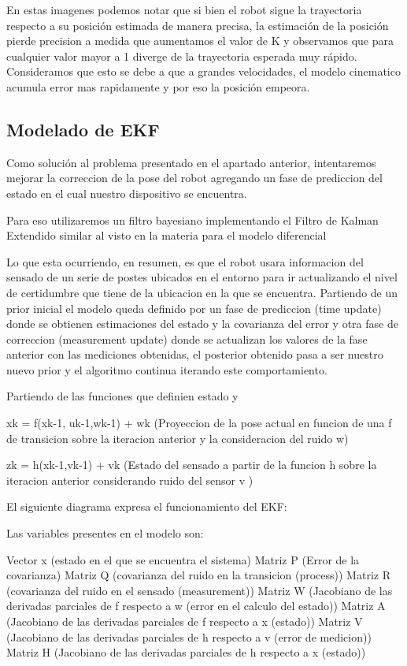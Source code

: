 

En estas imagenes podemos notar que si bien el robot sigue la trayectoria respecto a su posición estimada de manera precisa, la estimación de la posición pierde precision a medida que aumentamos el valor de K y observamos que para cualquier valor mayor a 1 diverge de la trayectoria esperada muy rápido. Consideramos que esto se debe a que a grandes velocidades, el modelo cinematico acumula error mas rapidamente y por eso la posición empeora.

\subsection{Modelado de EKF}

Como solución al problema presentado en el apartado anterior, intentaremos mejorar la correccion de la pose del robot agregando un fase de prediccion del estado en el cual nuestro dispositivo se encuentra.


Para eso utilizaremos un filtro bayesiano implementando el Filtro de Kalman Extendido similar al visto en la materia para el modelo diferencial

Lo que esta ocurriendo, en resumen, es que el robot usara informacion del sensado de un serie de postes ubicados en el entorno para ir actualizando el nivel de certidumbre que tiene de la ubicacion en la que se encuentra. Partiendo de un prior inicial el modelo queda definido por un fase de prediccion (time update) donde se obtienen estimaciones del estado y la covarianza del error y otra fase de correccion (measurement update) donde se actualizan los valores de la fase anterior con las mediciones obtenidas, el posterior obtenido pasa a ser nuestro nuevo prior y el algoritmo continua iterando este comportamiento.


Partiendo de las funciones que definien estado y 

xk = f(xk-1, uk-1,wk-1) + wk  (Proyeccion de la pose actual en funcion de una f de transicion sobre la iteracion anterior y la consideracion del ruido w)

zk = h(xk-1,vk-1) + vk   (Estado del sensado a partir de la funcion h sobre la iteracion anterior considerando ruido del sensor v )

El siguiente diagrama expresa el funcionamiento del EKF:



Las variables presentes en el modelo son: 

Vector x (estado en el que se encuentra el sistema)
Matriz P (Error de la covarianza)
Matriz Q (covarianza del ruido en la transicion (process))
Matriz R (covarianza del ruido en el sensado (measurement))
Matriz W (Jacobiano de las derivadas parciales de f respecto a w (error en el calculo del estado))
Matriz A (Jacobiano de las derivadas parciales de f respecto a x (estado))
Matriz V (Jacobiano de las derivadas parciales de h respecto a v (error de medicion))
Matriz H (Jacobiano de las derivadas parciales de h respecto a x (estado))
 
